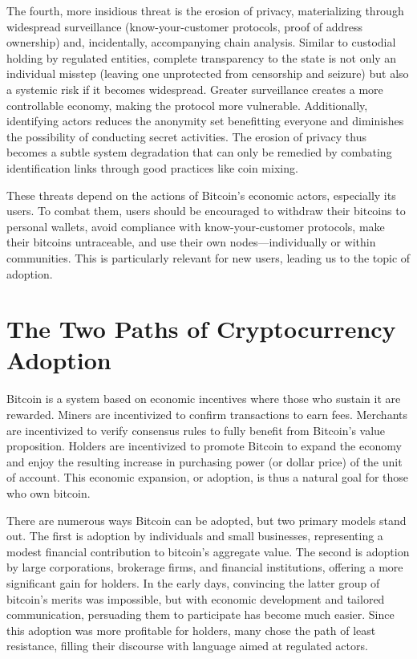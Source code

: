 \documentclass[
  a5paper,
  smalldemyvopaper,10pt,twoside,onecolumn,openright,extrafontsizes,hidelinks]{memoir}
\begin{document}
The fourth, more insidious threat is the erosion of privacy,
materializing through widespread surveillance (know-your-customer
protocols, proof of address ownership) and, incidentally, accompanying
chain analysis. Similar to custodial holding by regulated entities,
complete transparency to the state is not only an individual misstep
(leaving one unprotected from censorship and seizure) but also a
systemic risk if it becomes widespread. Greater surveillance creates a
more controllable economy, making the protocol more vulnerable.
Additionally, identifying actors reduces the anonymity set benefitting
everyone and diminishes the possibility of conducting secret activities.
The erosion of privacy thus becomes a subtle system degradation that can
only be remedied by combating identification links through good
practices like coin mixing.

These threats depend on the actions of Bitcoin's economic actors,
especially its users. To combat them, users should be encouraged to
withdraw their bitcoins to personal wallets, avoid compliance with
know-your-customer protocols, make their bitcoins untraceable, and use
their own nodes---individually or within communities. This is
particularly relevant for new users, leading us to the topic of
adoption.

\section*{The Two Paths of Cryptocurrency
Adoption}\label{the-two-paths-of-cryptocurrency-adoption}


Bitcoin is a system based on economic incentives where those who sustain
it are rewarded. Miners are incentivized to confirm transactions to earn
fees. Merchants are incentivized to verify consensus rules to fully
benefit from Bitcoin's value proposition. Holders are incentivized to
promote Bitcoin to expand the economy and enjoy the resulting increase
in purchasing power (or dollar price) of the unit of account. This
economic expansion, or adoption, is thus a natural goal for those who
own bitcoin.

There are numerous ways Bitcoin can be adopted, but two primary models
stand out. The first is adoption by individuals and small businesses,
representing a modest financial contribution to bitcoin's aggregate
value. The second is adoption by large corporations, brokerage firms,
and financial institutions, offering a more significant gain for
holders. In the early days, convincing the latter group of bitcoin's
merits was impossible, but with economic development and tailored
communication, persuading them to participate has become much easier.
Since this adoption was more profitable for holders, many chose the path
of least resistance, filling their discourse with language aimed at
regulated actors.
\end{document}
